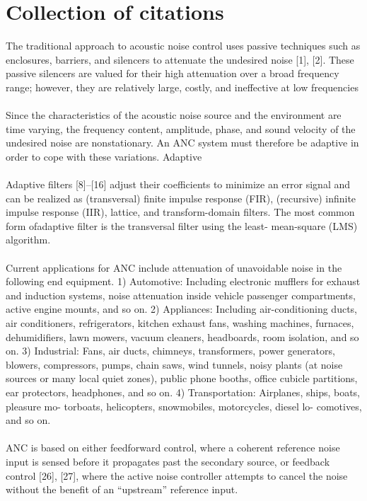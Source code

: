 \section{Collection of citations}
The traditional approach to acoustic noise control uses passive techniques such as enclosures, barriers, and silencers to attenuate the undesired noise [1], [2]. These passive silencers are valued for their high attenuation over a broad frequency range; however, they are relatively large, costly, and ineffective at low frequencies\cite{Kuo1999}
\\
\\
Since the characteristics of the acoustic noise source and the environment are time varying, the frequency content, amplitude, phase, and sound velocity of the undesired noise are nonstationary. An ANC system must therefore be adaptive in order to cope with these variations. Adaptive\cite{Kuo1999}
\\
\\
Adaptive filters [8]–[16] adjust their coefficients to minimize an error signal and can be realized as (transversal) finite impulse response (FIR), (recursive) infinite impulse response (IIR), lattice, and transform-domain filters. The most common form ofadaptive filter is the transversal filter using the least- mean-square (LMS) algorithm.\cite{Kuo1999}
\\
\\
Current applications for ANC include attenuation of unavoidable noise in the following end equipment. 1) Automotive: Including electronic mufflers for exhaust
and induction systems, noise attenuation inside vehicle passenger compartments, active engine mounts, and so on. 2) Appliances: Including air-conditioning ducts, air conditioners, refrigerators, kitchen exhaust fans, washing machines, furnaces, dehumidifiers, lawn mowers, vacuum cleaners, headboards, room isolation, and so on. 3) Industrial: Fans, air ducts, chimneys, transformers,
power generators, blowers, compressors, pumps, chain saws, wind tunnels, noisy plants (at noise sources or many local quiet zones), public phone booths, office cubicle partitions, ear protectors, headphones, and so on. 4) Transportation: Airplanes, ships, boats, pleasure mo- torboats, helicopters, snowmobiles, motorcycles, diesel lo- comotives, and so on.\cite{Kuo1999}
\\
\\
ANC is based on either feedforward control, where a coherent reference noise input is sensed before it propagates past the secondary source, or feedback control [26], [27], where the active noise controller attempts to cancel the noise without the benefit of an “upstream” reference input.\cite{Kuo1999}
